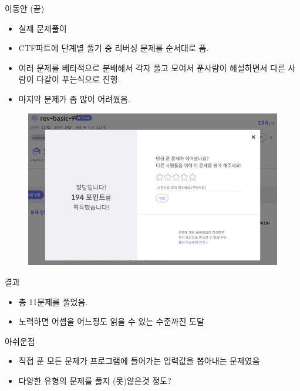 \documentclass[10pt]{beamer}
\begin{document}
\begin{frame}{이동안 (끝)}
    \begin{itemize}
        \item 실제 문제풀이
        \item CTF파트에 단계별 풀기 중 리버싱 문제를 순서대로 품.
        \item 여러 문제를 베타적으로 분배해서 각자 풀고 모여서 푼사람이 해설하면서 다른 사람이 다같이 푸는식으로 진행.
        \item 마지막 문제가 좀 많이 어려웠음.
    \end{itemize}
    \begin{figure}
        \includegraphics[width=0.6\columnwidth]{rev.jpg}
    \end{figure}
\end{frame}

\begin{frame}{결과}
    \begin{itemize}
        \item 총 11문제를 풀었음.
        \item 노력하면 어셈을 어느정도 읽을 수 있는 수준까진 도달
    \end{itemize}
\end{frame}


\begin{frame}{아쉬운점}
    \begin{itemize}
        \item 직접 푼 모든 문제가 프로그램에 들어가는 입력값을 뽑아내는 문제였음
        \item 다양한 유형의 문제를 풀지 (못)않은것 정도?
    \end{itemize}
\end{frame}
\end{document}
